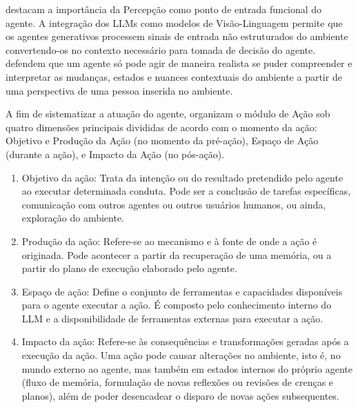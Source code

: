 \documentclass[12pt,oneside,a4paper,brazil,sumario=tradicional]{abntex2}
\begin{document}
\textcite{sapkota2026} destacam a importância da Percepção como ponto de entrada funcional do agente. A integração dos LLMs como modelos de Visão-Linguagem permite que os agentes generativos processem sinais de entrada não estruturados do ambiente convertendo-os no contexto necessário para tomada de decisão do agente. \textcite{gao2023} defendem que um agente só pode agir de maneira realista se puder compreender e interpretar as mudanças, estados e nuances contextuais do ambiente a partir de uma perspectiva de uma pessoa inserida no ambiente.

A fim de sistematizar a atuação do agente, \textcite{wang2023} organizam o módulo de Ação sob quatro dimensões principais divididas de acordo com o momento da ação: Objetivo e Produção da Ação (no momento da pré-ação), Espaço de Ação (durante a ação), e Impacto da Ação (no pós-ação).

\begin{enumerate}
  \item Objetivo da ação: Trata da intenção ou do resultado pretendido pelo agente ao executar determinada conduta. Pode ser a conclusão de tarefas específicas, comunicação com outros agentes ou outros usuários humanos, ou ainda, exploração do ambiente.
  \item Produção da ação: Refere-se ao mecanismo e à fonte de onde a ação é originada. Pode acontecer a partir da recuperação de uma memória, ou a partir do plano de execução elaborado pelo agente.
  \item Espaço de ação: Define o conjunto de ferramentas e capacidades disponíveis para o agente executar a ação. É composto pelo conhecimento interno do LLM e a disponibilidade de ferramentas externas para executar a ação.
  \item Impacto da ação: Refere-se às consequências e transformações geradas após a execução da ação. Uma ação pode causar alterações no ambiente, isto é, no mundo externo ao agente, mas também em estados internos do próprio agente (fluxo de memória, formulação de novas reflexões ou revisões de crenças e planos), além de poder desencadear o disparo de novas ações subsequentes.
\end{enumerate}
\end{document}
